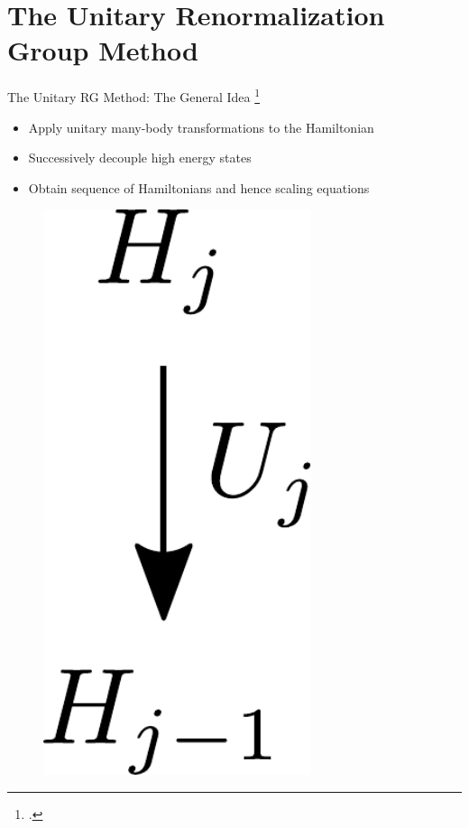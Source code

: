 \documentclass[10pt,aspectratio=169]{beamer}
\begin{document}
\section{The Unitary Renormalization Group Method}
\label{method}
\begin{frame}[noframenumbering]{The Unitary RG Method: The General Idea}
\footcite{anirbanurg1,anirbanurg2}

\begin{minipage}{0.8\textwidth}
\begin{itemize}[<+->]
	\item Apply unitary many-body transformations to the Hamiltonian\\[10pt]
	\item Successively decouple high energy states\\[10pt]
	\item Obtain sequence of Hamiltonians and hence scaling equations
\end{itemize}
\end{minipage}
\begin{minipage}{0.15\textwidth}
\begin{figure}
	\includegraphics[width=0.7\textwidth]{figures/urg_schematic.pdf}
\end{figure}
\end{minipage}
\end{frame}
\end{document}
